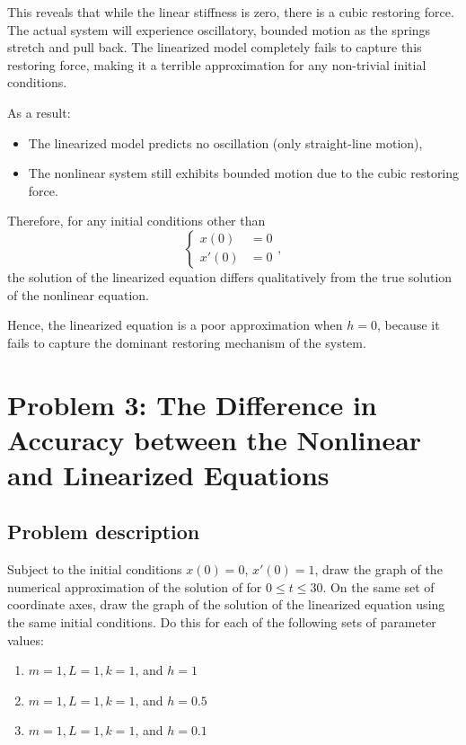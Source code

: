 \documentclass[12pt, a4paper]{report}
\renewcommand{\eqref}[1]{\originaleqref{#1}}
\begin{document}
	This reveals that while the linear stiffness is zero, there is a cubic restoring force. The actual system will experience oscillatory, bounded motion as the springs stretch and pull back. The linearized model completely fails to capture this restoring force, making it a terrible approximation for any non-trivial initial conditions.
	
	As a result:
	\begin{itemize}
		\item The linearized model predicts no oscillation (only straight-line motion),
		\item The nonlinear system still exhibits bounded motion due to the cubic restoring force.
	\end{itemize}
	
	Therefore, for any initial conditions other than
	\begin{equation*}
		\begin{cases}
			x(0) &= 0 \\
			x'(0) &= 0
		\end{cases},
	\end{equation*}
	the solution of the linearized equation differs qualitatively from the true solution of the nonlinear equation.
	
	Hence, the linearized equation is a poor approximation when $h = 0$, because it fails to capture the dominant restoring mechanism of the system.
	
	\section{Problem 3: The Difference in Accuracy between the Nonlinear and Linearized Equations}
	\subsection{Problem description}
	Subject to the initial conditions $x(0) = 0$, $x'(0) = 1$, draw the graph of the numerical approximation of the solution of \eqref{eq:1} for $0 \le t \le 30$. On the same set of coordinate axes, draw the graph of the solution of the linearized equation using the same initial conditions. Do this for each of the following sets of parameter values:
	
	\begin{enumerate}[label=\textbf{\color{blue}\roman*.}]
		\item $m = 1, L = 1, k = 1$, and $h = 1$
		\item $m = 1, L = 1, k = 1$, and $h = 0.5$
		\item $m = 1, L = 1, k = 1$, and $h = 0.1$
	\end{enumerate}
	
\end{document}
